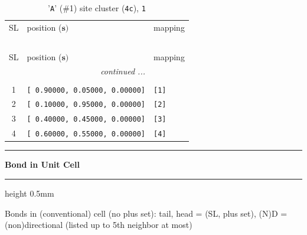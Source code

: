 \documentclass[fleqn,10pt,landscape]{jsarticle}
\begin{document}
\renewcommand{\arraystretch}{1.6}
\begin{longtable}[l]{cll}
\captionsetup{justification=raggedright, singlelinecheck=off}
\caption{'\texttt{A}' (\#1) site cluster (\texttt{4c}), \texttt{1}}
 \\
 \hline \hline
SL & position ($\bm{s})$ & mapping \\ \hline \endfirsthead

\multicolumn{2}{l}{\tablename\ \thetable{}} \\
 \hline \hline
SL & position ($\bm{s})$ & mapping \\ \hline \endhead

 \hline \hline
\multicolumn{2}{r}{\footnotesize\it continued ...} \\ \endfoot

 \hline \hline
\multicolumn{2}{r}{} \\ \endlastfoot

1 & \texttt{[ 0.90000, 0.05000, 0.00000]} & \texttt{[1]} \\ \hline
2 & \texttt{[ 0.10000, 0.95000, 0.00000]} & \texttt{[2]} \\ \hline
3 & \texttt{[ 0.40000, 0.45000, 0.00000]} & \texttt{[3]} \\ \hline
4 & \texttt{[ 0.60000, 0.55000, 0.00000]} & \texttt{[4]} \\
\end{longtable}
\vspace{5mm}
\noindent \rule[0.5mm]{5mm}{0.5mm}\hspace{3mm}\textbf{Bond in Unit Cell}\hspace{3mm}\leaders\hrule height 0.5mm\hfill\kern0pt
\vspace{3mm}

\noindent Bonds in (conventional) cell (no plus set): tail, head = (SL, plus set), (N)D = (non)directional (listed up to 5th neighbor at most)
\end{document}
